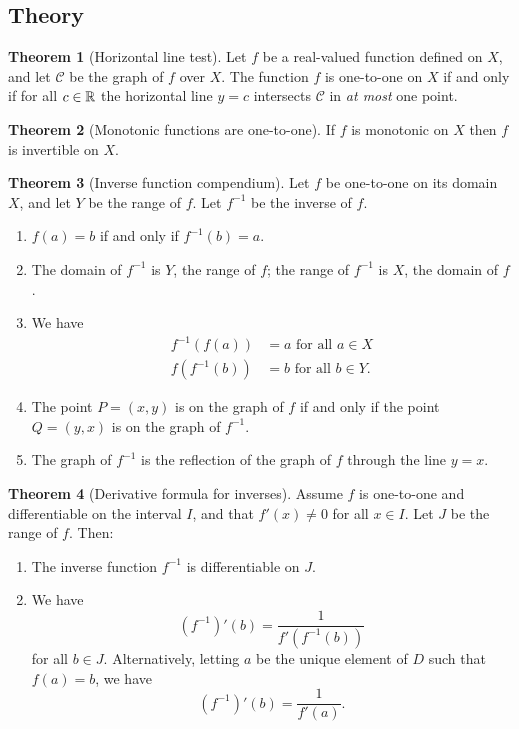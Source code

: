 \documentclass[11pt]{article}
\theoremstyle{definition}
\theoremstyle{named}
\newtheorem*{namedtheorem}{Theorem}
\numberwithin{myalgctr}{section}
\begin{document}
 \subsection*{Theory}
\begin{namedtheorem}[Horizontal line test] Let $f$ be a real-valued function defined on $X$, and let $\mathcal{C}$ be the graph of $f$ over $X$. The function $f$ is one-to-one on $X$ if and only if for all $c\in{\mathbb R}$ the horizontal line $y=c$ intersects $\mathcal{C}$ in {\em at most} one point.

\end{namedtheorem}
\begin{namedtheorem}[Monotonic functions are one-to-one] If $f$ is monotonic on $X$ then $f$ is invertible on $X$.
\end{namedtheorem}
\begin{namedtheorem}[Inverse function compendium] Let $f$ be one-to-one on its domain $X$, and let $Y$ be the range of $f$. Let $f^{-1}$ be the inverse of $f$.
  \begin{enumerate}[itemsep=0pt]
    \item $f(a)=b$ if and only if $f^{-1}(b)=a$.
    \item The domain of $f^{-1}$ is $Y$, the range of $f$; the range of $f^{-1}$ is $X$, the domain of $f$.
    \item We have
    \begin{align*}
      f^{-1}(f(a))&=a \text{ for all } a\in X\\
      f(f^{-1}(b))&=b \text{ for all } b\in Y.
    \end{align*}
    \item The point $P=(x,y)$ is on the graph of $f$ if and only if the point $Q=(y,x)$ is on the graph of $f^{-1}$.
    \item The graph of $f^{-1}$ is the reflection of the graph of $f$ through the line $y=x$.
  \end{enumerate}

\end{namedtheorem}
\begin{namedtheorem}[Derivative formula for inverses] Assume $f$ is one-to-one and differentiable on the interval $I$, and that $f'(x)\ne 0$ for all $x\in I$. Let $J$ be the range of $f$. Then:
  \begin{enumerate}
    \item The inverse function $f^{-1}$ is differentiable on $J$.
    \item We have
    \[
    (f^{-1})'(b)=\frac{1}{f'(f^{-1}(b))}
    \]
    for all $b\in J$. Alternatively, letting $a$ be the unique element of $D$ such that $f(a)=b$, we have
    \[
    (f^{-1})'(b)=\frac{1}{f'(a)}.
    \]
  \end{enumerate}

\end{namedtheorem}
\end{document}

